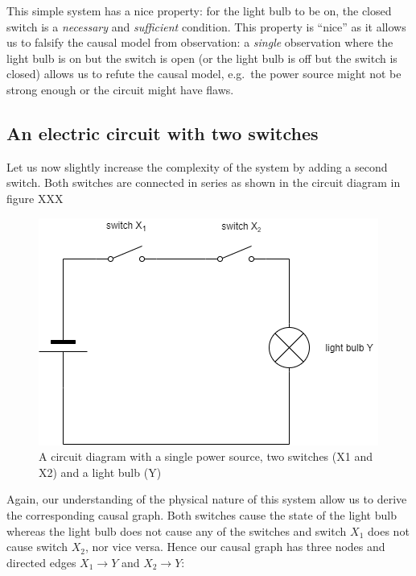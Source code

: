 \documentclass[
]{book}
\theoremstyle{definition}
\theoremstyle{definition}
\theoremstyle{definition}
\theoremstyle{remark}
\begin{document}
This simple system has a nice property: for the light bulb to be on, the closed switch is a \emph{necessary} and \emph{sufficient} condition. This property is ``nice'' as it allows us to falsify the causal model from observation: a \emph{single} observation where the light bulb is on but the switch is open (or the light bulb is off but the switch is closed) allows us to refute the causal model, e.g.~the power source might not be strong enough or the circuit might have flaws.

\hypertarget{an-electric-circuit-with-two-switches}{%
\subsection{An electric circuit with two switches}\label{an-electric-circuit-with-two-switches}}

Let us now slightly increase the complexity of the system by adding a second switch. Both switches are connected in series as shown in the circuit diagram in figure XXX

\begin{figure}
\centering
\includegraphics{images/causal_models-simple_electric_2.png}
\caption{A circuit diagram with a single power source, two switches (X1 and X2) and a light bulb (Y)}
\end{figure}

Again, our understanding of the physical nature of this system allow us to derive the corresponding causal graph. Both switches cause the state of the light bulb whereas the light bulb does not cause any of the switches and switch \(X_1\) does not cause switch \(X_2\), nor vice versa. Hence our causal graph has three nodes and directed edges \(X_1 \rightarrow Y\) and \(X_2 \rightarrow Y\):
\end{document}

